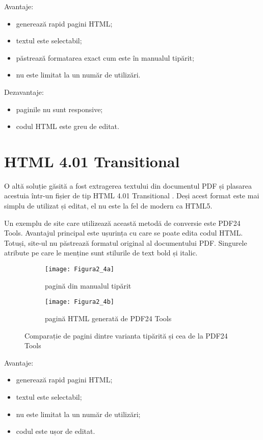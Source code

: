 \noindent
Avantaje:
\begin{itemize}
	\item generează rapid pagini HTML;
	\item textul este selectabil;
	\item păstrează formatarea exact cum este în manualul tipărit;
	\item nu este limitat la un număr de utilizări.
\end{itemize}

\noindent
Dezavantaje:
\begin{itemize}
	\item paginile nu sunt responsive;
	\item codul HTML este greu de editat.
\end{itemize}

\section{HTML 4.01 Transitional}

O altă soluție găsită a fost extragerea textului din documentul PDF și plasarea acestuia într-un fișier de tip HTML 4.01 Transitional \cite{raggett1997html}. Deși acest format este mai simplu de utilizat și editat, el nu este la fel de modern ca HTML5.

Un exemplu de site care utilizează această metodă de conversie este PDF24 Tools. Avantajul principal este ușurința cu care se poate edita codul HTML. Totuși, site-ul nu păstrează formatul original al documentului PDF. Singurele atribute pe care le menține sunt stilurile de text bold și italic.
\begin{figure}[H]
	\centering
	\begin{subfigure}{.5\textwidth}
		\centering
		\texttt{[image: Figura2\_4a]}
		\caption{pagină din manualul tipărit}
		\label{fig:Figura2_4a}
	\end{subfigure}%
	\begin{subfigure}{.5\textwidth}
		\centering
		\texttt{[image: Figura2\_4b]}
		\caption{pagină HTML generată de PDF24 Tools}
		\label{fig:Figura2_4b}
	\end{subfigure}
	\caption{Comparație de pagini dintre varianta tipărită și cea de la PDF24 Tools}
	\label{fig:Figura2_4}
\end{figure}

\noindent
Avantaje:
\begin{itemize}
	\item generează rapid pagini HTML;
	\item textul este selectabil;
	\item nu este limitat la un număr de utilizări;
	\item codul este ușor de editat.
\end{itemize}

